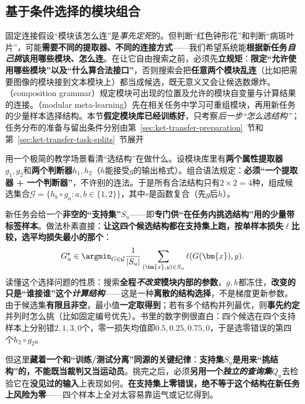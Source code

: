\subsection{基于条件选择的模块组合}
\label{sec:ket-integration-conditional-modules}

固定连接假设“模块该怎么连”是\emph{事先定死}的。但判断“红色钟形花”和判断“病斑叶片”，可能\textbf{需要不同的提取器、不同的连接方式}——我们希望系统能\textbf{根据新任务\emph{自己挑}该用哪些模块、怎么连}。在让它自由搜索之前，必须先\textbf{立规矩}：\textbf{限定“允许使用哪些模块”以及“什么算合法接口”}，否则搜索会把\textbf{任意两个模块乱连}（比如把需要图像的模块接到文本模块上）都当成候选，既无意义又会让候选数爆炸。（composition grammar）规定模块可出现的位置及允许的模块自变量与计算结果的连接。（modular meta-learning）先在相关任务中学习可重组模块，再用新任务的少量样本选择结构。本节\textbf{假定模块库已经训练好}，只考察\emph{后一步“怎么选结构”}；任务分布的准备与留出条件分别由第~\ref{sec:ket-transfer-preparation}~节和第~\ref{sec:ket-transfer-task-splits}~节展开

用一个极简的教学场景看清“选结构”在做什么。设模块库里有\textbf{两个属性提取器}$g_1,g_2$和\textbf{两个判断器}$h_1,h_2$（$h$能接受$g$的输出格式）。组合语法规定：\textbf{必须“一个提取器 + 一个判断器”}，不许别的连法。于是所有合法结构只有$2\times2=4$种，组成候选集合$\mathcal{G}=\{h_b\circ g_a:a,b\in\{1,2\}\}$，其中$\circ$是函数复合（先$g$后$h$）。

新任务会给一个\textbf{非空的“支持集”}$S_u$——即\textbf{专门供“在任务内挑选结构”用的少量带标签样本}。做法朴素直接：\textbf{让这四个候选结构都在支持集上跑，按单样本损失}$\ell$\textbf{比较，选平均损失最小的那个}：
\begin{equation}
  G_u^\star\in\argmin_{G\in\mathcal{G}}
  \frac{1}{|S_u|}\sum_{(\bm{x},y)\in S_u}\ell(G(\bm{x}),y).
  \label{eq:ket-integration-structure-search}
\end{equation}
读懂这个选择问题的性质：搜索\textbf{全程\emph{不改变}模块内部的参数}，$g,h$都冻住，\textbf{改变的只是“谁接谁”这个\emph{计算结构}}——这是一种\textbf{离散的结构选择}，不是梯度更新参数。由于候选集\textbf{有限且非空}，最小值\textbf{一定取得到}；若有多个结构并列最优，则\textbf{事先约定}并列时怎么挑（比如固定编号优先）。书里的数字例很直白：四个候选在四个支持样本上分别错$2,1,3,0$个，零一损失均值即$0.5,0.25,0.75,0$，于是选零错误的第四个$h_2\circ g_2$。

但这里\textbf{藏着一个和“训练/测试分离”同源的关键纪律}：\textbf{支持集$S_u$是用来“挑结构”的，不能既当裁判又当运动员}。挑完之后，必须\textbf{另用一个\emph{独立的查询集}$Q_u$}去检验它在\textbf{没见过的输入}上表现如何。\textbf{在支持集上零错误，绝不等于这个结构在新任务上风险为零}——四个样本上全对太容易靠运气或记忆得到。

